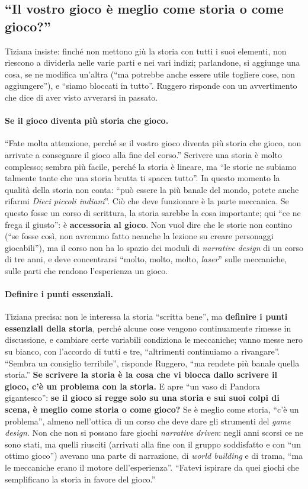 \subsection{``Il vostro gioco è meglio come storia o come gioco?''}

Tiziana insiste: finché non mettono giù la storia con tutti i suoi elementi, non riescono
a dividerla nelle varie parti e nei vari indizi; parlandone, si aggiunge una cosa, se ne
modifica un'altra (``ma potrebbe anche essere utile togliere cose, non aggiungere''), e
``siamo bloccati in tutto''. Ruggero risponde con un avvertimento che dice di aver visto
avverarsi in passato.

\paragraph{Se il gioco diventa più storia che gioco.} ``Fate molta attenzione, perché se
il vostro gioco diventa più storia che gioco, non arrivate a consegnare il gioco alla fine
del corso.'' Scrivere una storia è molto complesso; sembra più facile, perché la storia è
lineare, ma ``le storie ne subiamo talmente tante che una storia brutta ti spacca tutto''.
In questo momento la qualità della storia non conta: ``può essere la più banale del mondo,
potete anche rifarmi \emph{Dieci piccoli indiani}''. Ciò che deve funzionare è la parte
meccanica. Se questo fosse un corso di scrittura, la storia sarebbe la cosa importante;
qui ``ce ne frega il giusto'': è \textbf{accessoria al gioco}. Non vuol dire che le storie
non contino (``se fosse così, non avremmo fatto neanche la lezione su creare personaggi
giocabili''), ma il corso non ha lo spazio dei moduli di \emph{narrative design} di un
corso di tre anni, e deve concentrarsi ``molto, molto, molto, \emph{laser}'' sulle
meccaniche, sulle parti che rendono l'esperienza un gioco.

\paragraph{Definire i punti essenziali.} Tiziana precisa: non le interessa la storia
``scritta bene'', ma \textbf{definire i punti essenziali della storia}, perché alcune cose
vengono continuamente rimesse in discussione, e cambiare certe variabili condiziona le
meccaniche; vanno messe nero su bianco, con l'accordo di tutti e tre, ``altrimenti
continuiamo a rivangare''. ``Sembra un consiglio terribile'', risponde Ruggero, ``ma
rendete più banale quella storia.'' \textbf{Se scrivere la storia è la cosa che vi blocca
dallo scrivere il gioco, c'è un problema con la storia.} E apre ``un vaso di Pandora
gigantesco'': \textbf{se il gioco si regge solo su una storia e sui suoi colpi di scena, è
meglio come storia o come gioco?} Se è meglio come storia, ``c'è un problema'', almeno
nell'ottica di un corso che deve dare gli strumenti del \emph{game design}. Non che non si
possano fare giochi \emph{narrative driven}: negli anni scorsi ce ne sono stati, ma quelli
riusciti (arrivati alla fine con il gruppo soddisfatto e con ``un ottimo gioco'') avevano
una parte di narrazione, di \emph{world building} e di trama, ``ma le meccaniche erano il
motore dell'esperienza''. ``Fatevi ispirare da quei giochi che semplificano la storia in
favore del gioco.''

